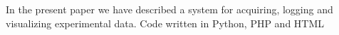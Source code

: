 In the present paper we have described a system for acquiring, logging and visualizing experimental data. Code written in Python, PHP and HTML 
